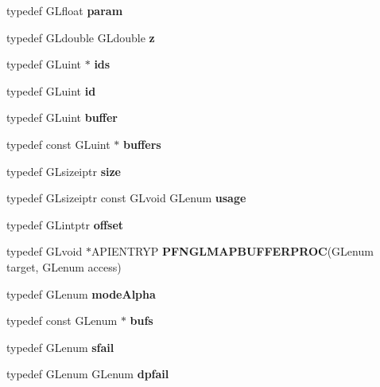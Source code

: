 \begin{DoxyCompactItemize}
\item 
typedef G\+Lfloat {\bfseries param}\label{_s_d_l__opengl_8h_ac7c896d55e93a6cf7ff8524005b4e7b4}

\item 
typedef G\+Ldouble G\+Ldouble {\bfseries z}\label{_s_d_l__opengl_8h_a5b27107fca91cf19a778530405575b37}

\item 
typedef G\+Luint $\ast$ {\bfseries ids}\label{_s_d_l__opengl_8h_a9d87e17a2e32dd2a7b881c7b1ca24a98}

\item 
typedef G\+Luint {\bfseries id}\label{_s_d_l__opengl_8h_a58c2a664503e14ffb8f21012aabff3e9}

\item 
typedef G\+Luint {\bfseries buffer}\label{_s_d_l__opengl_8h_ac4fdb15bdbcd63430bab668b5419ed9f}

\item 
typedef const G\+Luint $\ast$ {\bfseries buffers}\label{_s_d_l__opengl_8h_acaf3212fc88caa23745613e709a3e869}

\item 
typedef G\+Lsizeiptr {\bfseries size}\label{_s_d_l__opengl_8h_a3d1e3edfcf61ca2d831883e1afbad89e}

\item 
typedef G\+Lsizeiptr const G\+Lvoid G\+Lenum {\bfseries usage}\label{_s_d_l__opengl_8h_aae276f20e85f16470de5a0a71eb25bc2}

\item 
typedef G\+Lintptr {\bfseries offset}\label{_s_d_l__opengl_8h_aa782f3aea23e3c30029c811241dc2c82}

\item 
typedef G\+Lvoid $\ast$A\+P\+I\+E\+N\+T\+R\+Y\+P {\bfseries P\+F\+N\+G\+L\+M\+A\+P\+B\+U\+F\+F\+E\+R\+P\+R\+O\+C}(G\+Lenum target, G\+Lenum access)\label{_s_d_l__opengl_8h_a84fb210ad9a61812a2cc667169dc4fdf}

\item 
typedef G\+Lenum {\bfseries mode\+Alpha}\label{_s_d_l__opengl_8h_a08966b5acb82a4208c175a6fbb064430}

\item 
typedef const G\+Lenum $\ast$ {\bfseries bufs}\label{_s_d_l__opengl_8h_a9250a0c49b6ffdfaa7eb9fc4f50cc8e4}

\item 
typedef G\+Lenum {\bfseries sfail}\label{_s_d_l__opengl_8h_a6114b7cdfde5ff0225f7f47480d099c6}

\item 
typedef G\+Lenum G\+Lenum {\bfseries dpfail}\label{_s_d_l__opengl_8h_afb5ba0587287e9f41ad8ba8ba3813267}


\end{DoxyCompactItemize}
